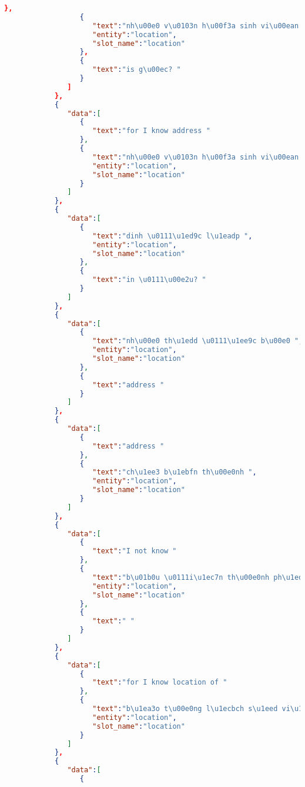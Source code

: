 \begin{lstlisting}[language=json,firstnumber=1]
                  },
                  {
                     "text":"nh\u00e0 v\u0103n h\u00f3a sinh vi\u00ean ",
                     "entity":"location",
                     "slot_name":"location"
                  },
                  {
                     "text":"is g\u00ec? "
                  }
               ]
            },
            {
               "data":[
                  {
                     "text":"for I know address "
                  },
                  {
                     "text":"nh\u00e0 v\u0103n h\u00f3a sinh vi\u00ean ",
                     "entity":"location",
                     "slot_name":"location"
                  }
               ]
            },
            {
               "data":[
                  {
                     "text":"dinh \u0111\u1ed9c l\u1eadp ",
                     "entity":"location",
                     "slot_name":"location"
                  },
                  {
                     "text":"in \u0111\u00e2u? "
                  }
               ]
            },
            {
               "data":[
                  {
                     "text":"nh\u00e0 th\u1edd \u0111\u1ee9c b\u00e0 ",
                     "entity":"location",
                     "slot_name":"location"
                  },
                  {
                     "text":"address "
                  }
               ]
            },
            {
               "data":[
                  {
                     "text":"address "
                  },
                  {
                     "text":"ch\u1ee3 b\u1ebfn th\u00e0nh ",
                     "entity":"location",
                     "slot_name":"location"
                  }
               ]
            },
            {
               "data":[
                  {
                     "text":"I not know "
                  },
                  {
                     "text":"b\u01b0u \u0111i\u1ec7n th\u00e0nh ph\u1ed1 h\u1ed3 ch\u00ed minh ",
                     "entity":"location",
                     "slot_name":"location"
                  },
                  {
                     "text":" "
                  }
               ]
            },
            {
               "data":[
                  {
                     "text":"for I know location of "
                  },
                  {
                     "text":"b\u1ea3o t\u00e0ng l\u1ecbch s\u1eed vi\u1ec7t nam ",
                     "entity":"location",
                     "slot_name":"location"
                  }
               ]
            },
            {
               "data":[
                  {

\end{lstlisting}
